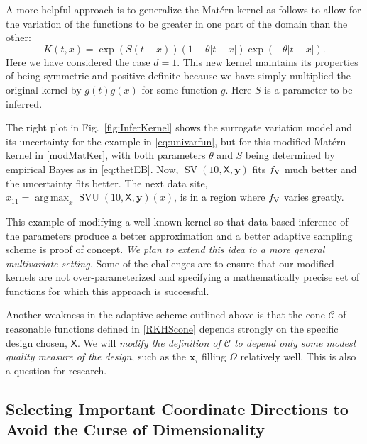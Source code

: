 \documentclass[11pt]{NSFamsart}
\DeclareMathOperator*{\argmax}{arg\,max}
\DeclareMathOperator{\SVAR}{SV} %
\DeclareMathOperator{\SVARERR}{SVU} %
\newcommand{\VAR}{\textup{V}}
\newcommand{\mX}{\mathsf{X}}
\newcommand{\bx}{{\boldsymbol{x}}}
\newcommand{\by}{{\boldsymbol{y}}}
\newcommand{\calc}{{\mathcal{C}}}
\def\abs#1{\ensuremath{\left \lvert #1 \right \rvert}}
\begin{document}
A more helpful approach is to generalize the Mat\'ern kernel as follows to allow for the variation of the functions to be greater in one part of the domain than the other:
\begin{equation} \label{modMatKer}
    K(t,x) = \exp(S(t+x))(1 + \theta \abs{t-x}) \exp(-\theta\abs{t-x}).
\end{equation}
Here we have considered the case $d=1$.  This new kernel maintains its properties of being symmetric and positive definite because we have simply multiplied the original kernel by $g(t)g(x)$ for some function $g$.  Here $S$ is a parameter to be inferred.

The right plot in Fig.\ \ref{fig:InferKernel} shows the surrogate variation model and its uncertainty for the example in \eqref{eq:univarfun}, but for this modified Mat\'ern kernel in \eqref{modMatKer}, with both parameters $\theta$ and $S$ being determined by empirical Bayes as in \eqref{eq:thetEB}.  Now, $\SVAR(10,\mX,\by)$ fits $f_{\VAR}$ much better and the uncertainty fits better.  The next data site, $x_{11} = \argmax_x \SVARERR(10,\mX,\by)(x)$, is in a region where $f_{\VAR}$ varies greatly. 

This example of modifying a well-known kernel so that data-based inference of the parameters produce a better approximation and a better adaptive sampling scheme is proof of concept. \emph{ We plan to extend this idea to a more general multivariate setting.}  Some of the challenges are to ensure that our modified kernels are not over-parameterized and specifying a mathematically precise set of functions for which this approach is successful.

Another weakness in the adaptive scheme outlined above is that the cone $\calc$ of reasonable functions defined in  \eqref{RKHScone} depends strongly on the specific design chosen, $\mX$.  We will \emph{modify the definition of $\calc$ to depend only some modest quality measure of the design}, such as the $\bx_i$ filling  $\Omega$ relatively well.  This is also a question for research.

\subsection{Selecting Important Coordinate Directions to Avoid the Curse of Dimensionality} \label{sec:selectCoord}
\end{document}
